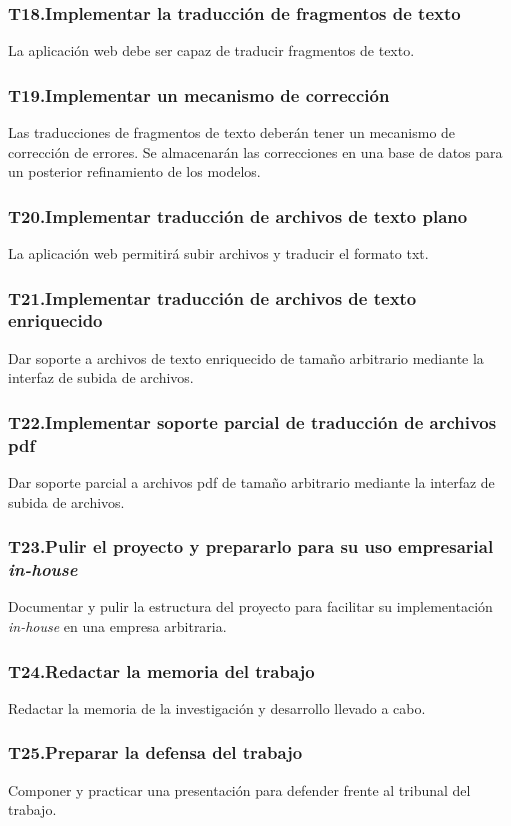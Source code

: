 \subsubsection{T18.\quad Implementar la traducción de fragmentos de texto}\label{T18}
La aplicación web debe ser capaz de traducir fragmentos de texto.
\subsubsection{T19.\quad Implementar un mecanismo de corrección}\label{T19}
Las traducciones de fragmentos de texto deberán tener un mecanismo de corrección de errores.
Se almacenarán las correcciones en una base de datos para un posterior
refinamiento de los modelos.
\subsubsection{T20.\quad Implementar traducción de archivos de texto plano}\label{T20}
La aplicación web permitirá subir archivos y traducir el formato txt.
\subsubsection{T21.\quad Implementar traducción de archivos de texto enriquecido}\label{T21}
Dar soporte a archivos de texto enriquecido de tamaño arbitrario mediante la interfaz
de subida de archivos.
\subsubsection{T22.\quad Implementar soporte parcial de traducción de archivos pdf}\label{T22}
Dar soporte parcial a archivos pdf de tamaño arbitrario mediante la interfaz
de subida de archivos.
\subsubsection{T23.\quad Pulir el proyecto y prepararlo para su uso empresarial \textit{in-house}}\label{T23}
Documentar y pulir la estructura del proyecto para facilitar su implementación \textit{in-house}
en una empresa arbitraria.
\subsubsection{T24.\quad Redactar la memoria del trabajo}\label{T24}
Redactar la memoria de la investigación y desarrollo llevado a cabo.
\subsubsection{T25.\quad Preparar la defensa del trabajo}\label{T25}
Componer y practicar una presentación para defender frente al tribunal del trabajo.


